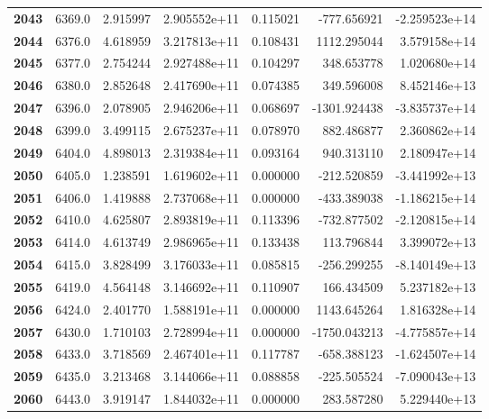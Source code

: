 \documentclass{report}[12pt]
\begin{document}
\begin{center}
\begin{tabular}{lrrrrrr}
\textbf{2043} &         6369.0 &   2.915997 &  2.905552e+11 &    0.115021 &  -777.656921 & -2.259523e+14 \\
\textbf{2044} &         6376.0 &   4.618959 &  3.217813e+11 &    0.108431 &  1112.295044 &  3.579158e+14 \\
\textbf{2045} &         6377.0 &   2.754244 &  2.927488e+11 &    0.104297 &   348.653778 &  1.020680e+14 \\
\textbf{2046} &         6380.0 &   2.852648 &  2.417690e+11 &    0.074385 &   349.596008 &  8.452146e+13 \\
\textbf{2047} &         6396.0 &   2.078905 &  2.946206e+11 &    0.068697 & -1301.924438 & -3.835737e+14 \\
\textbf{2048} &         6399.0 &   3.499115 &  2.675237e+11 &    0.078970 &   882.486877 &  2.360862e+14 \\
\textbf{2049} &         6404.0 &   4.898013 &  2.319384e+11 &    0.093164 &   940.313110 &  2.180947e+14 \\
\textbf{2050} &         6405.0 &   1.238591 &  1.619602e+11 &    0.000000 &  -212.520859 & -3.441992e+13 \\
\textbf{2051} &         6406.0 &   1.419888 &  2.737068e+11 &    0.000000 &  -433.389038 & -1.186215e+14 \\
\textbf{2052} &         6410.0 &   4.625807 &  2.893819e+11 &    0.113396 &  -732.877502 & -2.120815e+14 \\
\textbf{2053} &         6414.0 &   4.613749 &  2.986965e+11 &    0.133438 &   113.796844 &  3.399072e+13 \\
\textbf{2054} &         6415.0 &   3.828499 &  3.176033e+11 &    0.085815 &  -256.299255 & -8.140149e+13 \\
\textbf{2055} &         6419.0 &   4.564148 &  3.146692e+11 &    0.110907 &   166.434509 &  5.237182e+13 \\
\textbf{2056} &         6424.0 &   2.401770 &  1.588191e+11 &    0.000000 &  1143.645264 &  1.816328e+14 \\
\textbf{2057} &         6430.0 &   1.710103 &  2.728994e+11 &    0.000000 & -1750.043213 & -4.775857e+14 \\
\textbf{2058} &         6433.0 &   3.718569 &  2.467401e+11 &    0.117787 &  -658.388123 & -1.624507e+14 \\
\textbf{2059} &         6435.0 &   3.213468 &  3.144066e+11 &    0.088858 &  -225.505524 & -7.090043e+13 \\
\textbf{2060} &         6443.0 &   3.919147 &  1.844032e+11 &    0.000000 &   283.587280 &  5.229440e+13 \\

\end{tabular}
\end{center}
\end{document}
